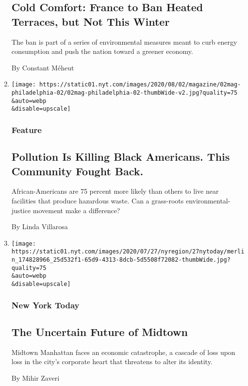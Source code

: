 \begin{enumerate}
  \hypertarget{cold-comfort-france-to-ban-heated-terraces-but-not-this-winter}{%
  \subsection{Cold Comfort: France to Ban Heated Terraces, but Not This
  Winter}\label{cold-comfort-france-to-ban-heated-terraces-but-not-this-winter}}

  The ban is part of a series of environmental measures meant to curb
  energy consumption and push the nation toward a greener economy.

  By Constant Méheut
\item
  \href{/2020/07/28/magazine/pollution-philadelphia-black-americans.html}{}

  \texttt{[image: https://static01.nyt.com/images/2020/08/02/magazine/02mag-philadelphia-02/02mag-philadelphia-02-thumbWide-v2.jpg?quality=75\\\&auto=webp\\\&disable=upscale]}

  \hypertarget{feature}{%
  \subsubsection{Feature}\label{feature}}

  \hypertarget{pollution-is-killing-black-americans-this-community-fought-back}{%
  \subsection{Pollution Is Killing Black Americans. This Community
  Fought
  Back.}\label{pollution-is-killing-black-americans-this-community-fought-back}}

  African-Americans are 75 percent more likely than others to live near
  facilities that produce hazardous waste. Can a grass-roots
  environmental-justice movement make a difference?

  By Linda Villarosa
\item
  \href{/2020/07/27/nyregion/nyc-midtown-manhattan-coronavirus.html}{}

  \texttt{[image: https://static01.nyt.com/images/2020/07/27/nyregion/27nytoday/merlin\_174828966\_25d532f1-65d9-4313-8dcb-5d5508f72082-thumbWide.jpg?quality=75\\\&auto=webp\\\&disable=upscale]}

  \hypertarget{new-york-today}{%
  \subsubsection{New York Today}\label{new-york-today}}

  \hypertarget{the-uncertain-future-of-midtown}{%
  \subsection{The Uncertain Future of
  Midtown}\label{the-uncertain-future-of-midtown}}

  Midtown Manhattan faces an economic catastrophe, a cascade of loss
  upon loss in the city's corporate heart that threatens to alter its
  identity.~

  By Mihir Zaveri
\end{enumerate}

